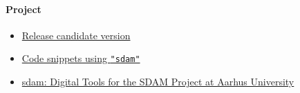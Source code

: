 \documentclass[a4paper,11pt]{memoir}
\providecommand{\tightlist}{%
  \setlength{\itemsep}{0pt}\setlength{\parskip}{0pt}}
\let\oldparagraph\paragraph
\renewcommand{\paragraph}[1]{\oldparagraph{#1}\mbox{}}
\begin{document}
\hypertarget{project}{%
\paragraph{Project}\label{project}}

\begin{itemize}
\tightlist
\item
  \href{https://github.com/sdam-au/sdam}{Release candidate version}
\item
  \href{https://github.com/sdam-au/R_code}{Code snippets using
  \texttt{"sdam"}}
\item
  \href{https://sdam-au.github.io/sdam-au/}{sdam: Digital Tools for the SDAM
  Project at Aarhus University}
\end{itemize}

~
\end{document}

